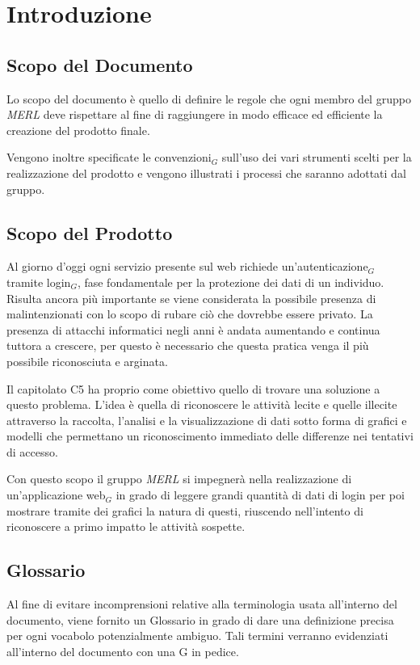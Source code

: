 \chapter{Introduzione}

\section{Scopo del Documento}
Lo scopo del documento è quello di definire le regole che ogni membro del gruppo \textit{MERL} deve rispettare al fine di raggiungere in modo efficace ed efficiente la creazione del prodotto finale.

Vengono inoltre specificate le convenzioni$_G$ sull'uso dei vari strumenti scelti per la realizzazione del prodotto e vengono illustrati i processi che saranno adottati dal gruppo.

\section{Scopo del Prodotto}
Al giorno d'oggi ogni servizio presente sul web richiede un'autenticazione$_G$ tramite login$_G$, fase fondamentale per la protezione dei dati di un individuo. Risulta ancora più importante se viene considerata la possibile presenza di malintenzionati con lo scopo di rubare ciò che dovrebbe essere privato. La presenza di attacchi informatici negli anni è andata aumentando e continua tuttora a crescere, per questo è necessario che questa pratica venga il più possibile riconosciuta e arginata.

Il capitolato C5 ha proprio come obiettivo quello di trovare una soluzione a questo problema. L'idea è quella di riconoscere le attività lecite e quelle illecite attraverso la raccolta, l'analisi e la visualizzazione di dati sotto forma di grafici e modelli che permettano un riconoscimento immediato delle differenze nei tentativi di accesso.

Con questo scopo il gruppo \textit{MERL} si impegnerà nella realizzazione di un'applicazione web$_G$ in grado di leggere grandi quantità di dati di login per poi mostrare tramite dei grafici la natura di questi, riuscendo nell'intento di riconoscere a primo impatto le attività sospette.

\section{Glossario}
Al fine di evitare incomprensioni relative alla terminologia usata all'interno del documento, viene fornito un Glossario in grado di dare una definizione precisa per ogni vocabolo potenzialmente ambiguo. Tali termini verranno evidenziati all'interno del documento con una G in pedice.

